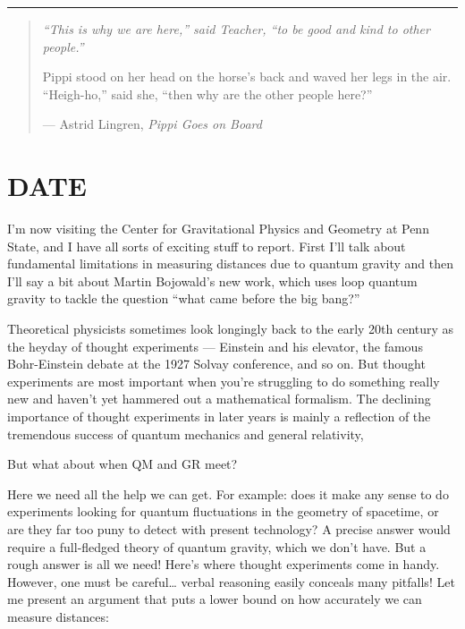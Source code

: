 \documentclass{article}
\def\tightlist{}
\renewcommand{\texttt}[1]{%
  \begingroup
  \ttfamily
  \begingroup\lccode`~=`/\lowercase{\endgroup\def~}{/\discretionary{}{}{}}%
  \begingroup\lccode`~=`[\lowercase{\endgroup\def~}{[\discretionary{}{}{}}%
  \begingroup\lccode`~=`.\lowercase{\endgroup\def~}{.\discretionary{}{}{}}%
  \catcode`/=\active\catcode`[=\active\catcode`.=\active
  \scantokens{#1\noexpand}%
  \endgroup
}
\begin{document}
\begin{center}\rule{0.5\linewidth}{0.5pt}\end{center}

\begin{quote}
\emph{``This is why we are here,'' said Teacher, ``to be good and kind
to other people.''}

Pippi stood on her head on the horse's back and waved her legs in the
air. ``Heigh-ho,'' said she, ``then why are the other people here?''

--- Astrid Lingren, \emph{Pippi Goes on Board}
\end{quote}
\hypertarget{week167}{%
\section{DATE}\label{week167}}

I'm now visiting the Center for Gravitational Physics and Geometry at
Penn State, and I have all sorts of exciting stuff to report. First I'll
talk about fundamental limitations in measuring distances due to quantum
gravity and then I'll say a bit about Martin Bojowald's new work, which
uses loop quantum gravity to tackle the question ``what came before the
big bang?''

Theoretical physicists sometimes look longingly back to the early 20th
century as the heyday of thought experiments --- Einstein and his
elevator, the famous Bohr-Einstein debate at the 1927 Solvay conference,
and so on. But thought experiments are most important when you're
struggling to do something really new and haven't yet hammered out a
mathematical formalism. The declining importance of thought experiments
in later years is mainly a reflection of the tremendous success of
quantum mechanics and general relativity,

But what about when QM and GR meet?

Here we need all the help we can get. For example: does it make any
sense to do experiments looking for quantum fluctuations in the geometry
of spacetime, or are they far too puny to detect with present
technology? A precise answer would require a full-fledged theory of
quantum gravity, which we don't have. But a rough answer is all we need!
Here's where thought experiments come in handy. However, one must be
careful\ldots{} verbal reasoning easily conceals many pitfalls! Let me
present an argument that puts a lower bound on how accurately we can
measure distances:

\end{document}
